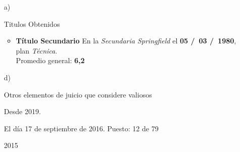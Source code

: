 \begin{enumerate}[leftmargin=0.8cm]

  \item[a)]{Titulos Obtenidos

    \begin{itemize}[leftmargin=0.2cm]

      \item {
        \textbf{Título Secundario}
        En la \emph{Secundaria Springfield} el \textbf{05 \slash \ 03 \slash \ 1980}, \\
        plan \emph{Técnica}. \\
        Promedio general: \textbf{6,2}
      }

    \end{itemize}

  }

  \item[d)]{Otros elementos de juicio que considere valiosos

    \begin{itemize}[leftmargin=0.2cm]

      {}{Desde 2019.}{}

        {}
        {El día 17 de septiembre de 2016.}
        {Puesto: 12 de 79}

      {}{2015}{}

    \end{itemize}

  }

\end{enumerate}
